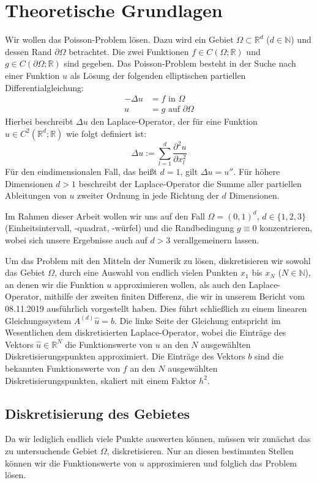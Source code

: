 \documentclass{scrartcl}
\newcommand{\R}{\mathbb{R}}
\begin{document}
\pagebreak
\section{Theoretische Grundlagen}
Wir wollen das Poisson-Problem lösen.
Dazu wird ein Gebiet $\Omega\subset\R^d$ ($d\in\mathbb{N}$) und dessen Rand $\partial\Omega$ betrachtet.
Die zwei Funktionen $f\in C(\Omega ; \R)$ und $g\in C(\partial\Omega ; \R)$ sind gegeben.
Das Poisson-Problem besteht in der Suche nach einer Funktion $u$ als Lösung der folgenden elliptischen partiellen Differentialgleichung:
\[\begin{split}
-\Delta u &= f \textrm{ in } \Omega\\
        u &= g \textrm{ auf } \partial\Omega
\end{split}
\]
Hierbei beschreibt $\Delta u$ den Laplace-Operator, der für eine Funktion $u\in C^2(\R^d;\R)$ wie folgt definiert ist: \[\Delta u := \sum_{l=1}^{d} \frac{\partial^2 u}{\partial x^2_l}\]
Für den eindimensionalen Fall, das heißt $d=1$, gilt $\Delta u = u''$. Für höhere Dimensionen $d>1$ beschreibt der Laplace-Operator die Summe aller partiellen Ableitungen von $u$ zweiter Ordnung in jede Richtung der $d$ Dimensionen.

Im Rahmen dieser Arbeit wollen wir uns auf den Fall $\Omega=(0,1)^d$, $d\in\{1, 2, 3\}$ (Einheitsintervall, -quadrat, -würfel) und die Randbedingung $g\equiv0$ konzentrieren, wobei sich unsere Ergebnisse auch auf $d>3$ verallgemeinern lassen.

Um das Problem mit den Mitteln der Numerik zu lösen, diskretisieren wir sowohl das Gebiet $\Omega$, durch eine Auswahl von endlich vielen Punkten $x_1$ bis $x_N$ ($N\in\mathbb{N}$), an denen wir die Funktion $u$ approximieren wollen, als auch den Laplace-Operator, mithilfe der zweiten finiten Differenz, die wir in unserem Bericht vom 08.11.2019 ausführlich vorgestellt haben.
Dies führt schließlich zu einem linearen Gleichungssystem $A^{(d)}\hat{u}=b$.
Die linke Seite der Gleichung entspricht im Wesentlichen dem diskretisierten Laplace-Operator, wobei die Einträge des Vektors $\hat{u}\in\R^N$ die Funktionswerte von $u$ an den $N$ ausgewählten Diskretisierungspunkten approximiert.
Die Einträge des Vektors $b$ sind die bekannten Funktionswerte von $f$ an den $N$ ausgewählten Diskretisierungspunkten, skaliert mit einem Faktor $h^2$.\cite{rheinbach2015, rabus2019}

\subsection{Diskretisierung des Gebietes}
Da wir lediglich endlich viele Punkte auswerten können, müssen wir zunächst das zu untersuchende Gebiet  $\Omega$, diskretisieren.
Nur an diesen bestimmten Stellen können wir die Funktionswerte von $u$ approximieren und folglich das Problem lösen.
\end{document}
